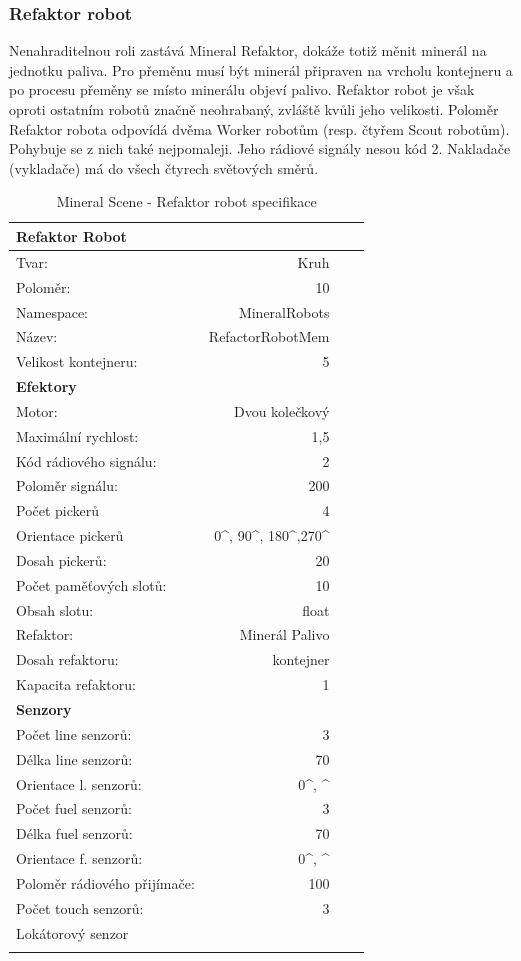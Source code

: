 \subsubsection{Refaktor robot}
Nenahraditelnou roli zastává Mineral Refaktor, dokáže totiž měnit minerál na jednotku paliva. Pro přeměnu musí být minerál připraven na vrcholu kontejneru a po procesu přeměny se místo minerálu objeví palivo. Refaktor robot je však oproti ostatním robotů značně neohrabaný, zvláště kvůli jeho velikosti. Poloměr Refaktor robota odpovídá dvěma Worker robotům (resp. čtyřem Scout robotům). Pohybuje se z nich také nejpomaleji. Jeho rádiové signály nesou kód 2. Nakladače (vykladače) má do všech čtyrech světových směrů. 
\par  
\begin{table}[h]\centering
	\begin{tabular}{l@{\hspace{1.0cm}}D{.}{,}{2.2}D{.}{,}{2.2}D{.}{,}{2.3}}
		\toprule
		\textbf{Refaktor Robot} \\
		\midrule
		Tvar: & Kruh\\
		Poloměr: & 10 \\
		Namespace: & MineralRobots\\
		Název: & RefactorRobotMem \\
		Velikost kontejneru: & 5\\
		\midrule
		\textbf{Efektory} \\
		\midrule
		Motor: & Dvou kolečkový \\
		Maximální rychlost: & 1,5 \\
		Kód rádiového signálu: & 2\\
		Poloměr signálu: & 200\\
		Počet pickerů & 4\\
		Orientace pickerů & 0^\circ, 90^\circ, 180^\circ,270^\circ\\ 
		Dosah pickerů: & 20\\
		Počet paměťových slotů: &10 \\
		Obsah slotu: & float\\
		Refaktor: & Minerál \Rightarrow Palivo \\
		Dosah refaktoru:  & kontejner \\
		Kapacita refaktoru: & 1\\ 
		\midrule 
		\textbf{Senzory} \\
		\midrule
		Počet line senzorů: &  3\\
		Délka line senzorů: & 70\\
		Orientace l. senzorů: & 0^\circ, ^\circ\\
		Počet fuel senzorů: &  3\\
		Délka fuel senzorů: & 70\\
		Orientace f. senzorů: & 0^\circ, ^\circ\\
		Poloměr rádiového přijímače: & 100 \\
		Počet touch senzorů: & 3 \\  
		Lokátorový senzor\\ 
		\bottomrule
	\end{tabular}
	\caption{Mineral Scene - Refaktor robot specifikace }
	\label{tab04:MineralRefactor}
\end{table}
\clearpage
